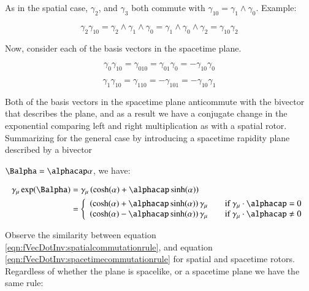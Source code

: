 As in the spatial case, $\gamma_{2}$, and $\gamma_{3}$ both commute with $\gamma_{10} = \gamma_1 \wedge \gamma_0$.  Example:

\begin{equation*}
\gamma_{2} \gamma_{10}
= \gamma_2 \wedge \gamma_1 \wedge \gamma_0
= \gamma_1 \wedge \gamma_0 \wedge \gamma_2
= \gamma_{10} \gamma_{2}
\end{equation*}

Now, consider each of the basis vectors in the spacetime plane.

\begin{equation*}
\gamma_{0} \gamma_{10}
= \gamma_{010}
= \gamma_{01} \gamma_{0}
= -\gamma_{10} \gamma_{0}
\end{equation*}

\begin{equation*}
\gamma_{1} \gamma_{10}
= \gamma_{110}
= -\gamma_{101}
= -\gamma_{10} \gamma_{1}
\end{equation*}

Both of the basis vectors in the spacetime plane anticommute with the bivector that describes the plane, and as a result we have a conjugate change in the exponential comparing left and right multiplication as with a spatial rotor.  Summarizing for the general case by introducing a spacetime rapidity plane described by a bivector

$\Balpha = \alphacap \alpha$, we have:

\begin{equation}\label{eqn:fVecDotInv:spacetimecommutationrule}
\begin{aligned}
\gamma_{\mu}\exp(\Balpha)
&= \gamma_{\mu}\left( \cosh(\alpha) + \alphacap\sinh(\alpha) \right) \\
&=
\left\{ 
\begin{array}{l l}
\left( \cosh(\alpha) + \alphacap\sinh(\alpha) \right) \gamma_{\mu} & \quad \mbox{if $\gamma_{\mu} \cdot \alphacap = 0$} \\
\left( \cosh(\alpha) - \alphacap\sinh(\alpha) \right) \gamma_{\mu} & \quad \mbox{if $\gamma_{\mu} \cdot \alphacap \ne 0$} \\
\end{array} \right.
\end{aligned}
\end{equation}

Observe the similarity between equation \ref{eqn:fVecDotInv:spatialcommutationrule}, and equation \ref{eqn:fVecDotInv:spacetimecommutationrule} for spatial
and spacetime rotors.  Regardless of whether the plane is spacelike, or a spacetime plane we have the same rule:


